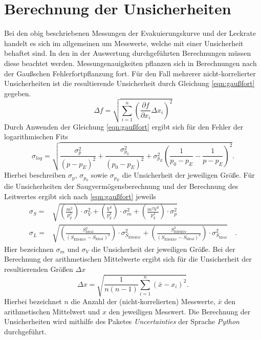 \section{Berechnung der Unsicherheiten}
\label{sec:unsicherheiten}
Bei den obig beschriebenen Messungen der Evakuierungskurve und der Leckrate handelt es sich
im allgemeinen um Messwerte, welche mit einer Unsicherheit behaftet sind. In den in der
Auswertung durchgeführten Berechnungen müssen diese beachtet werden. Messungenauigkeiten
pflanzen sich in Berechnungen nach der Gaußschen Fehlerfortpflanzung fort. Für den Fall mehrerer
nicht-korrelierter Unsicherheiten ist die resultierende Unsicherheit durch Gleichung \ref{eqn:gaußfort}
gegeben.
\begin{equation}
  \Delta f = \sqrt{\sum_{i=1}^{n} \left( \frac{\partial f}{\partial x_{i}} \Delta x_{i} \right)^{2}}
 \label{eqn:gaußfort}
\end{equation}
Durch Anwenden der Gleichung \ref{eqn:gaußfort} ergibt sich für den Fehler der logarithmischen Fits
\begin{equation}
  \sigma_{log} = \sqrt{\frac{\sigma_p^2}{(p-p_E)^2}+\frac{\sigma_{p_{0}}^2}{(p_0-p_E)^2}+\sigma_{p_E}^2 \left(\frac{1}{p_0-p_E}-\frac{1}{p-p_E}\right)^2}.
  \label{eqn:fehlerlog}
\end{equation}
Hierbei beschreiben $\sigma_{p}$, $\sigma_{p_{0}}$ sowie $\sigma_{p_{E}}$ die Unsicherheit der jeweiligen Größe.
Für die Unsicherheiten der Saugvermögensberechnung und der Berechnung des Leitwertes ergibt sich nach
\ref{eqn:gaußfort} jeweils
\begin{align}
  \sigma_{S} = & \sqrt{\left(\frac{m^2}{p_g^2}\right) \cdot \sigma_{V}^2 + \left(\frac{V^2}{p_g^2}\right) \cdot \sigma_m^2 + \left(\frac{m^2 V^2}{p_g^4}\right) \cdot \sigma_p^2} \\
  \sigma_{L} = & \sqrt{\left( \frac{ S_{\text{Ideal}}^2}{(S_{\text{Effektiv}}- S_{\text{Ideal}})^2} \right) \cdot \sigma_{S_{\text{Effektiv}}}^2 + \left( \frac{S_{\text{Effektiv}}^2}{(S_{\text{Effektiv}}- S_{\text{Ideal}})^2} \right) \cdot \sigma_{S_{\text{Ideal}}}^2} \quad.
  \label{eqn:fehlersaugleit}
\end{align}
Hier bezeichnen $\sigma_{m}$ und $\sigma_{V}$ die Unsicherheit der jeweiligen Größe.
Bei der Berechnung der arithmetischen Mittelwerte ergibt sich für die Unsicherheit der resultierenden
Größen $\Delta x$
\begin{equation}
 \Delta x = \sqrt{\frac{1}{n(n-1)} \sum_{i=1}^{n} (\bar{x} - x_{i})^{2}}.
 \label{eqn:statfehler}
\end{equation}
Hierbei bezeichnet $n$ die Anzahl der (nicht-korrelierten) Messwerte, $\bar{x}$ den arithmetischen Mittelwert
und $x$ den jeweiligen Messwert. Die Berechnung der Unsicherheiten wird mithilfe des Paketes
\textit{Uncertainties}\cite{uncertainties}
der Sprache \textit{Python}\cite{python} durchgeführt.
